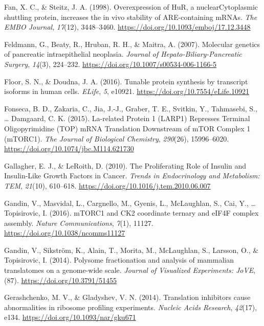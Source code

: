 \documentclass[12pt,openany]{book}
\begin{document}
\hypertarget{ref-Fan1998}{}
Fan, X. C., \& Steitz, J. A. (1998). Overexpression of HuR, a
nuclearCytoplasmic shuttling protein, increases the in vivo stability of
ARE-containing mRNAs. \emph{The EMBO Journal}, \emph{17}(12),
3448--3460. \url{https://doi.org/10.1093/emboj/17.12.3448}

\hypertarget{ref-Feldmann2007}{}
Feldmann, G., Beaty, R., Hruban, R. H., \& Maitra, A. (2007). Molecular
genetics of pancreatic intraepithelial neoplasia. \emph{Journal of
Hepato-Biliary-Pancreatic Surgery}, \emph{14}(3), 224--232.
\url{https://doi.org/10.1007/s00534-006-1166-5}

\hypertarget{ref-Floor2016}{}
Floor, S. N., \& Doudna, J. A. (2016). Tunable protein synthesis by
transcript isoforms in human cells. \emph{ELife}, \emph{5}, e10921.
\url{https://doi.org/10.7554/eLife.10921}

\hypertarget{ref-Fonseca2015}{}
Fonseca, B. D., Zakaria, C., Jia, J.-J., Graber, T. E., Svitkin, Y.,
Tahmasebi, S., \ldots{} Damgaard, C. K. (2015). La-related Protein 1
(LARP1) Represses Terminal Oligopyrimidine (TOP) mRNA Translation
Downstream of mTOR Complex 1 (mTORC1). \emph{The Journal of Biological
Chemistry}, \emph{290}(26), 15996--6020.
\url{https://doi.org/10.1074/jbc.M114.621730}

\hypertarget{ref-Gallagher2010}{}
Gallagher, E. J., \& LeRoith, D. (2010). The Proliferating Role of
Insulin and Insulin-Like Growth Factors in Cancer. \emph{Trends in
Endocrinology and Metabolism: TEM}, \emph{21}(10), 610--618.
\url{https://doi.org/10.1016/j.tem.2010.06.007}

\hypertarget{ref-Gandin2016}{}
Gandin, V., Masvidal, L., Cargnello, M., Gyenis, L., McLaughlan, S.,
Cai, Y., \ldots{} Topisirovic, I. (2016). mTORC1 and CK2 coordinate
ternary and eIF4F complex assembly. \emph{Nature Communications},
\emph{7}(1), 11127. \url{https://doi.org/10.1038/ncomms11127}

\hypertarget{ref-Gandin2014}{}
Gandin, V., Sikström, K., Alain, T., Morita, M., McLaughlan, S.,
Larsson, O., \& Topisirovic, I. (2014). Polysome fractionation and
analysis of mammalian translatomes on a genome-wide scale. \emph{Journal
of Visualized Experiments: JoVE}, (87).
\url{https://doi.org/10.3791/51455}

\hypertarget{ref-Gerashchenko2014}{}
Gerashchenko, M. V., \& Gladyshev, V. N. (2014). Translation inhibitors
cause abnormalities in ribosome profiling experiments. \emph{Nucleic
Acids Research}, \emph{42}(17), e134.
\url{https://doi.org/10.1093/nar/gku671}
\end{document}
